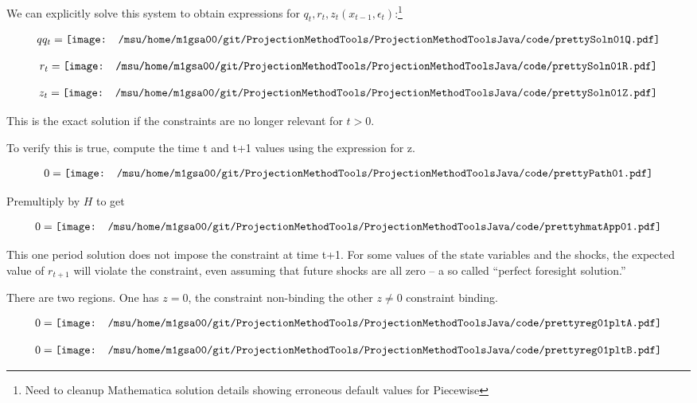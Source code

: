 We can explicitly solve this system to obtain  expressions for $q_t, r_t, z_{t}(x_{t-1},\epsilon_t) $:\footnote{Need to cleanup Mathematica solution details showing erroneous default values for Piecewise}

\begin{gather*}
  qq_t=\vcenter{\hbox{\texttt{[image: /msu/home/m1gsa00/git/ProjectionMethodTools/ProjectionMethodToolsJava/code/prettySoln01Q.pdf]}}}
\end{gather*}

\begin{gather*}
  r_t=\vcenter{\hbox{\texttt{[image: /msu/home/m1gsa00/git/ProjectionMethodTools/ProjectionMethodToolsJava/code/prettySoln01R.pdf]}}}
\end{gather*}

\begin{gather*}
  z_t=\vcenter{\hbox{\texttt{[image: /msu/home/m1gsa00/git/ProjectionMethodTools/ProjectionMethodToolsJava/code/prettySoln01Z.pdf]}}}
\end{gather*}

This is the exact solution if the constraints are no longer relevant for 
$t >0$.

To verify this is true, compute the time t and t+1 values using the expression for z.

\begin{gather*}
  0=\vcenter{\hbox{\texttt{[image: /msu/home/m1gsa00/git/ProjectionMethodTools/ProjectionMethodToolsJava/code/prettyPath01.pdf]}}}
\end{gather*}

Premultiply by $H$ to get

\begin{gather*}
  0=\vcenter{\hbox{\texttt{[image: /msu/home/m1gsa00/git/ProjectionMethodTools/ProjectionMethodToolsJava/code/prettyhmatApp01.pdf]}}}
\end{gather*}


This one period solution does not impose the constraint at time t+1.  For some values of the state variables and the shocks, the expected value 
of $r_{t+1}$ will violate the constraint, even assuming that future shocks are all zero -- a so called ``perfect foresight solution.''


There are two regions.  One has $z=0$, the constraint non-binding the other 
$z\ne 0$ constraint binding.


\begin{gather*}
  0=\vcenter{\hbox{\texttt{[image: /msu/home/m1gsa00/git/ProjectionMethodTools/ProjectionMethodToolsJava/code/prettyreg01pltA.pdf]}}}
\end{gather*}


\begin{gather*}
  0=\vcenter{\hbox{\texttt{[image: /msu/home/m1gsa00/git/ProjectionMethodTools/ProjectionMethodToolsJava/code/prettyreg01pltB.pdf]}}}
\end{gather*}


